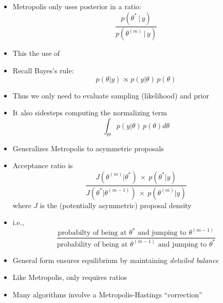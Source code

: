 \documentclass[10pt]{report}
\begin{document}
\begin{itemize}\small
\item Metropolis only uses posterior in a ratio:
\[
\frac{p(\theta^{*} \, | \, y)}
     {p(\theta^{(m)} \, | \, y)}
\]
\item This  the use of 
\item Recall Bayes's rule:
\[
p(\theta | y) \propto p(y|\theta) \, p(\theta)
\]
\item Thus we only need to evaluate sampling (likelihood) and prior
\item It also sidesteps computing the normalizing term
\[
\int_{\Theta} p(y|\theta) \, p(\theta) d\theta
\]
\end{itemize}

\begin{itemize}
\item Generalizes Metropolis to asymmetric proposals
\item Acceptance ratio is
\[
\frac{J(\theta^{(m)}|\theta^{*}) \ \times \ p(\theta^{*}|y)}
     {J(\theta^{*}|\theta^{(m-1)}) \ \times \ p(\theta^{(m)}|y)}
\]
where $J$ is the (potentially asymmetric) proposal density
\item i.e., 
{\small
\[
\frac{\mbox{probabilty of being at } \theta^*
      \mbox{ and jumping to } \theta^{(m-1)}}
     {\mbox{probability of being at } \theta^{(m-1)}
      \mbox{ and jumping to } \theta^{*}}
\]
}
\end{itemize}

\begin{itemize}
\item General form ensures equilibrium 
  by maintaining \emph{detailed balance}
\item Like Metropolis, only requires ratios
\item Many algorithms involve a Metropolis-Hastings ``correction''
\end{itemize}
\end{document}

